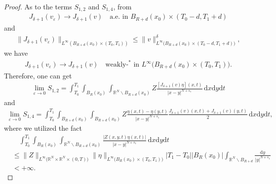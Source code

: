 \documentclass[reqno,10pt]{amsart}
\numberwithin{equation}{section}
\begin{document}
\begin{proof}
	As to the terms $S_{1,2}$ and $S_{1,4}$, from
	\begin{align*}
		J_{\delta+1}(v_\varepsilon)\rightarrow J_{\delta+1}(v)\quad\text{a.e. in }B_{R+d}(x_0)\times(T_0-d,T_1+d)
	\end{align*}
	and
	\begin{align*}
		\|J_{\delta+1}(v_\varepsilon)\|_{L^\infty\left( B_{R+d}(x_0)\times(T_0,T_1)\right) }\le\|v\|^\delta_{L^\infty\bigl( B_{R+d}(x_0)\times(T_0-d,T_1+d)\bigl) },
	\end{align*}
	we have
	\begin{align}
		\label{1.61}
		J_{\delta+1}(v_\varepsilon)\rightarrow J_{\delta+1}(v)\quad\text{weakly-}^*\text{ in }L^\infty\bigl( B_{R+d}(x_0)\times(T_0,T_1)\bigl). 
	\end{align}
	Therefore, one can get
	\begin{align*}
		\lim\limits_{\varepsilon\rightarrow0}S_{1,2}=\int_{T_0}^{T_1}\int_{B_R(x_0)}\int_{\mathbb{R}^N\backslash B_{R+d}(x_0)}Z\frac{\left[ J_{\delta+1}(v)\eta\right](x,t)}{|x-y|^{N+s_1}}\,\mathrm{d}x\mathrm{d}y\mathrm{d}t
	\end{align*}
	and
	\begin{align*}
		\lim\limits_{\varepsilon\rightarrow0}S_{1,4}=\int_{T_0}^{T_1}\int_{B_{R+d}(x_0)}\int_{B_{R+d}(x_0)}Z\frac{\eta(x,t)-\eta(y,t)}{|x-y|^{N+s_1}}\frac{J_{\delta+1}(v)(x,t)+J_{\delta+1}(v)(y,t)}{2}\,\mathrm{d}x\mathrm{d}y\mathrm{d}t,
	\end{align*}
	where we utilized the fact
	\begin{align*}
		&\quad\int_{T_0}^{T_1}\int_{B_R(x_0)}\int_{\mathbb{R}^N\backslash B_{R+d}(x_0)}\frac{|Z(x,y,t)\eta(x,t)|}{|x-y|^{N+s_1}}\,\mathrm{d}x\mathrm{d}y\mathrm{d}t\\
		&\le \|Z\|_{L^\infty\bigl(\mathbb{R}^N\times\mathbb{R}^N\times(0,T)\bigl)}\|\eta\|_{L^\infty\bigl(B_R(x_0)\times(T_0,T_1)\bigl)}|T_1-T_0||B_R(x_0)|\int_{\mathbb{R}^N\backslash B_{R+d}}\frac{\mathrm{d}y}{|y|^{N+s_1}}\\
		&<+\infty.
	\end{align*}
	

\end{proof}
\end{document}
